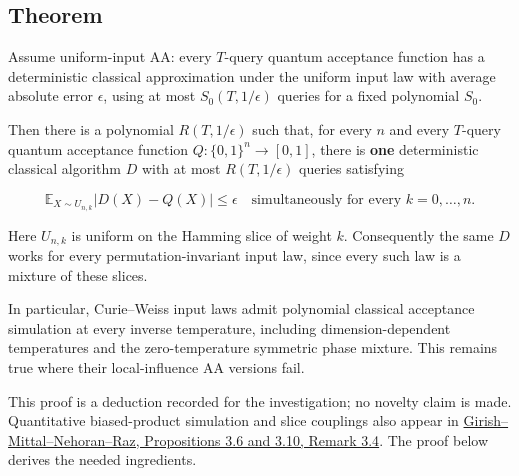 \subsection{Theorem}\label{exch:heading-2}

Assume uniform-input AA: every \(T\)-query quantum acceptance function
has a deterministic classical approximation under the uniform input law
with average absolute error \(\epsilon\), using at most
\(S_0(T,1/\epsilon)\) queries for a fixed polynomial \(S_0\).

Then there is a polynomial \(R(T,1/\epsilon)\) such that, for every
\(n\) and every \(T\)-query quantum acceptance function
\(Q:\{0,1\}^n\to[0,1]\), there is \textbf{one} deterministic classical
algorithm \(D\) with at most \(R(T,1/\epsilon)\) queries satisfying

\[
\mathbb E_{X\sim U_{n,k}}|D(X)-Q(X)|\le\epsilon
\quad\text{simultaneously for every }k=0,\ldots,n.
\]

Here \(U_{n,k}\) is uniform on the Hamming slice of weight \(k\).
Consequently the same \(D\) works for every permutation-invariant input
law, since every such law is a mixture of these slices.

In particular, Curie--Weiss input laws admit polynomial classical
acceptance simulation at every inverse temperature, including
dimension-dependent temperatures and the zero-temperature symmetric
phase mixture. This remains true where their local-influence AA versions
fail.

This proof is a deduction recorded for the investigation; no novelty
claim is made. Quantitative biased-product simulation and slice
couplings also appear in
\href{https://arxiv.org/html/2609.35327v1}{Girish--Mittal--Nehoran--Raz,
Propositions 3.6 and 3.10, Remark 3.4}. The proof below derives the
needed ingredients.
